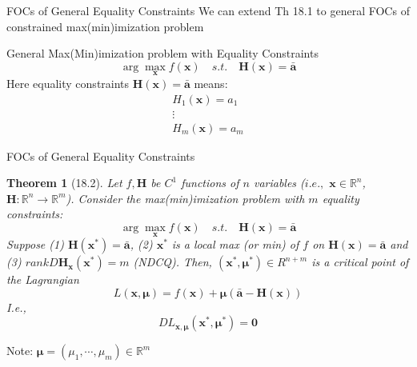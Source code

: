 \documentclass[a4paper,11pt]{article}
\newtheorem{thm}{Theorem}
\newcommand{\bb}{\mathbb}
\newcommand{\bd}{\mathbf}
\begin{document}
\begin{frame}[t]{FOCs of General Equality Constraints}
	We can extend Th 18.1 to general FOCs of constrained max(min)imization problem
	\begin{block}
		{General Max(Min)imization problem with Equality Constraints}
		\[
				\arg\max_{\bd{x}} f(\bd{x}) \quad s.t. \quad \bd{H}(\bd{x})=\bar{\bd{a}}
			\]
			Here equality constraints $\bd{H}(\bd{x})=\bar{\bd{a}}$ means:\[
				\begin{matrix}
					H_1(\bd{x})=a_1 \\
					\vdots\\
					H_m(\bd{x})=a_m
				\end{matrix}
			\]
	\end{block}

\end{frame}
\begin{frame}[t]{FOCs of General Equality Constraints}
	\begin{thm}
		[18.2] Let $f,\bd{H}$ be $C^1$ functions of $n$ variables ($i.e.,$ $\bd{x}\in\bb{R}^n$, $\bd{H}:\bb{R}^n\rightarrow\bb{R}^m$). Consider the max(min)imization problem with $m$ equality constraints:\[
			\arg\max_{\bd{x}} f(\bd{x}) \quad s.t.\quad \bd{H}(\bd{x})=\bar{\bd{a}}
		\]Suppose (1) $\bd{H}(\bd{x^\ast})=\bar{\bd{a}}$, (2) $\bd{x^\ast}$ is a local max (or min) of $f$ on $\bd{H}(\bd{x})=\bar{\bd{a}}$ and (3) $rank D\bd{H}_{\bd{x} }(\bd{x^\ast})=m$ (NDCQ). Then, $(\bd{x^\ast},\bd{\mu^\ast})\in{R}^{n+m}$ is a critical point of the Lagrangian\[
			L(\bd{x},\bd{\mu})=f(\bd{x})+\bd{\mu}(\bar{\bd{a}}-\bd{H}(\bd{x}))
		\]I.e.,\[
			DL_{\bd{x},\bd{\mu}}(\bd{x^\ast},\bd{\mu^\ast}) = \bd{0}
		\]
	\end{thm}
	Note: $\bd{\mu}=(\mu_1,\cdots,\mu_m)\in\bb{R}^m$
\end{frame}
\end{document}
